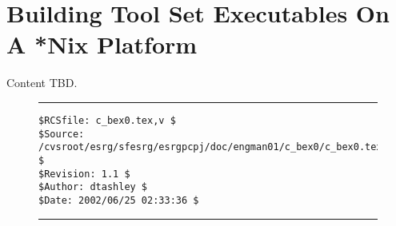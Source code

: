 %
\chapter{Building Tool Set Executables On A *Nix Platform}
\label{cbex0}

Content TBD.


\noindent\begin{figure}[!b]
\noindent\rule[-0.25in]{\textwidth}{1pt}
\begin{tiny}
\begin{verbatim}
$RCSfile: c_bex0.tex,v $
$Source: /cvsroot/esrg/sfesrg/esrgpcpj/doc/engman01/c_bex0/c_bex0.tex,v $
$Revision: 1.1 $
$Author: dtashley $
$Date: 2002/06/25 02:33:36 $
\end{verbatim}
\end{tiny}
\noindent\rule[0.25in]{\textwidth}{1pt}
\end{figure}
%

